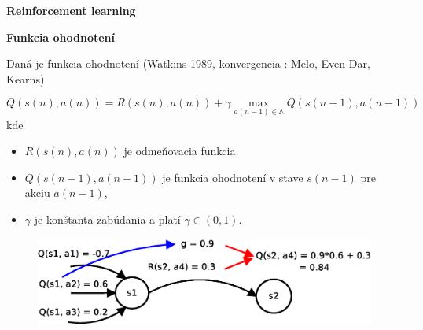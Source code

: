 \documentclass[xcolor=dvipsnames]{beamer}
\begin{document}
\begin{frame}{\bf Reinforcement learning}
\begin{minipage}{.5\textwidth}
\end{minipage}

\end{frame}


\begin{frame}{\bf Funkcia ohodnotení}

Daná je funkcia ohodnotení (Watkins 1989, konvergencia : Melo, Even-Dar, Kearns)

\begin{equation}
Q(s(n),a(n)) = R(s(n),a(n)) + \gamma \max_{a(n-1) \in \mathbb{A}} Q(s(n-1), a(n-1)) \nonumber
\label{eq:q_learning}
\end{equation}
kde \\

\begin{itemize}
 \item $R(s(n),a(n))$ je odmeňovacia funkcia \\
 \item $Q(s(n-1),a(n-1))$ je funkcia ohodnotení v stave $s(n-1)$ pre akciu $a(n-1)$, \\
 \item $\gamma$ je konštanta zabúdania a platí $\gamma \in (0, 1)$.
\end{itemize}

\begin{figure}[!htb]
\includegraphics[scale=.4]{../diagrams/q_learning_detail.eps}
\end{figure}

\end{frame}
\end{document}
